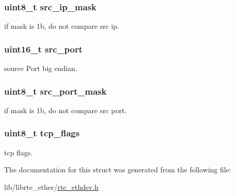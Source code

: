 \subsubsection[{src\+\_\+ip\+\_\+mask}]{\setlength{\rightskip}{0pt plus 5cm}uint8\+\_\+t src\+\_\+ip\+\_\+mask}\label{structrte__5tuple__filter_a24ea1adca0aeaee4b61cf17bafc9d156}
if mask is 1b, do not compare src ip. \hypertarget{structrte__5tuple__filter_ab98974981cf4c143fcee028643f313e6}{}
\subsubsection[{src\+\_\+port}]{\setlength{\rightskip}{0pt plus 5cm}uint16\+\_\+t src\+\_\+port}\label{structrte__5tuple__filter_ab98974981cf4c143fcee028643f313e6}
source Port big endian. \hypertarget{structrte__5tuple__filter_ad51b4863fb71d110274060e0f6450b7b}{}
\subsubsection[{src\+\_\+port\+\_\+mask}]{\setlength{\rightskip}{0pt plus 5cm}uint8\+\_\+t src\+\_\+port\+\_\+mask}\label{structrte__5tuple__filter_ad51b4863fb71d110274060e0f6450b7b}
if mask is 1b, do not compare src port. \hypertarget{structrte__5tuple__filter_ab393c6d5f386ec83c49c7e1496fbb0e1}{}
\subsubsection[{tcp\+\_\+flags}]{\setlength{\rightskip}{0pt plus 5cm}uint8\+\_\+t tcp\+\_\+flags}\label{structrte__5tuple__filter_ab393c6d5f386ec83c49c7e1496fbb0e1}
tcp flags. 

The documentation for this struct was generated from the following file\+:\begin{DoxyCompactItemize}
\item 
lib/librte\+\_\+ether/\hyperlink{rte__ethdev_8h}{rte\+\_\+ethdev.\+h}\end{DoxyCompactItemize}
